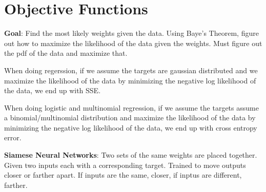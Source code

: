 \section{Objective Functions}

\textbf{Goal}: Find the most likely weights given the data. Using Baye's Theorem, figure out how to maximize the likelihood of the data given the weights. Must figure out the pdf of the data and maximize that.

When doing regerssion, if we assume the targets are gaussian distributed and we maximize the likelihood of the data by minimizing the negative log likelihood of the data, we end up with SSE.

When doing logistic and multinomial regression, if we assume the targets assume a binomial/multinomial distribution and maximize the likelihood of the data by minimizing the negative log likelihood of the data, we end up with cross entropy error.

\textbf{Siamese Neural Networks}: Two sets of the same weights are placed together. Given two inputs each with a corresponding target. Trained to move outputs closer or farther apart. If inputs are the same, closer, if inptus are different, farther.
